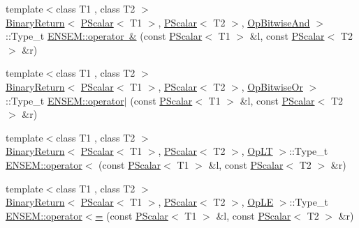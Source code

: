 \begin{DoxyCompactItemize}
\item 
{\footnotesize template$<$class T1 , class T2 $>$ }\\\mbox{\hyperlink{structENSEM_1_1BinaryReturn}{Binary\+Return}}$<$ \mbox{\hyperlink{classENSEM_1_1PScalar}{P\+Scalar}}$<$ T1 $>$, \mbox{\hyperlink{classENSEM_1_1PScalar}{P\+Scalar}}$<$ T2 $>$, \mbox{\hyperlink{structENSEM_1_1OpBitwiseAnd}{Op\+Bitwise\+And}} $>$\+::Type\+\_\+t \mbox{\hyperlink{group__primscalar_gadbbb42ee94a77c2df59c5a4cf78fddeb}{E\+N\+S\+E\+M\+::operator \&}} (const \mbox{\hyperlink{classENSEM_1_1PScalar}{P\+Scalar}}$<$ T1 $>$ \&l, const \mbox{\hyperlink{classENSEM_1_1PScalar}{P\+Scalar}}$<$ T2 $>$ \&r)
\item 
{\footnotesize template$<$class T1 , class T2 $>$ }\\\mbox{\hyperlink{structENSEM_1_1BinaryReturn}{Binary\+Return}}$<$ \mbox{\hyperlink{classENSEM_1_1PScalar}{P\+Scalar}}$<$ T1 $>$, \mbox{\hyperlink{classENSEM_1_1PScalar}{P\+Scalar}}$<$ T2 $>$, \mbox{\hyperlink{structENSEM_1_1OpBitwiseOr}{Op\+Bitwise\+Or}} $>$\+::Type\+\_\+t \mbox{\hyperlink{group__primscalar_ga246529f971eca0fda63267c9a68a51f7}{E\+N\+S\+E\+M\+::operator$\vert$}} (const \mbox{\hyperlink{classENSEM_1_1PScalar}{P\+Scalar}}$<$ T1 $>$ \&l, const \mbox{\hyperlink{classENSEM_1_1PScalar}{P\+Scalar}}$<$ T2 $>$ \&r)
\item 
{\footnotesize template$<$class T1 , class T2 $>$ }\\\mbox{\hyperlink{structENSEM_1_1BinaryReturn}{Binary\+Return}}$<$ \mbox{\hyperlink{classENSEM_1_1PScalar}{P\+Scalar}}$<$ T1 $>$, \mbox{\hyperlink{classENSEM_1_1PScalar}{P\+Scalar}}$<$ T2 $>$, \mbox{\hyperlink{structENSEM_1_1OpLT}{Op\+LT}} $>$\+::Type\+\_\+t \mbox{\hyperlink{group__primscalar_ga898f0000029c1749bdd5a60160848adb}{E\+N\+S\+E\+M\+::operator$<$}} (const \mbox{\hyperlink{classENSEM_1_1PScalar}{P\+Scalar}}$<$ T1 $>$ \&l, const \mbox{\hyperlink{classENSEM_1_1PScalar}{P\+Scalar}}$<$ T2 $>$ \&r)
\item 
{\footnotesize template$<$class T1 , class T2 $>$ }\\\mbox{\hyperlink{structENSEM_1_1BinaryReturn}{Binary\+Return}}$<$ \mbox{\hyperlink{classENSEM_1_1PScalar}{P\+Scalar}}$<$ T1 $>$, \mbox{\hyperlink{classENSEM_1_1PScalar}{P\+Scalar}}$<$ T2 $>$, \mbox{\hyperlink{structENSEM_1_1OpLE}{Op\+LE}} $>$\+::Type\+\_\+t \mbox{\hyperlink{group__primscalar_gadc72d49cf80f5b61a37c029861a74a5f}{E\+N\+S\+E\+M\+::operator$<$=}} (const \mbox{\hyperlink{classENSEM_1_1PScalar}{P\+Scalar}}$<$ T1 $>$ \&l, const \mbox{\hyperlink{classENSEM_1_1PScalar}{P\+Scalar}}$<$ T2 $>$ \&r)

\end{DoxyCompactItemize}
